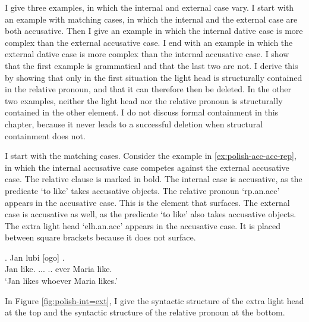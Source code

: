 I give three examples, in which the internal and external case vary.
I start with an example with matching cases, in which the internal and the external case are both accusative.
Then I give an example in which the internal dative case is more complex than the external accusative case.
I end with an example in which the external dative case is more complex than the internal accusative case.
I show that the first example is grammatical and that the last two are not. I derive this by showing that only in the first situation the light head is structurally contained in the relative pronoun, and that it can therefore then be deleted.
In the other two examples, neither the light head nor the relative pronoun is structurally contained in the other element.
I do not discuss formal containment in this chapter, because it never leads to a successful deletion when structural containment does not.

I start with the matching cases.
Consider the example in \ref{ex:polish-acc-acc-rep}, in which the internal accusative case competes against the external accusative case. The relative clause is marked in bold.
The internal case is accusative, as the predicate  `to like' takes accusative objects. The relative pronoun  `\ac{rp}.\ac{an}.\ac{acc}' appears in the accusative case. This is the element that surfaces.
The external case is accusative as well, as the predicate  `to like' also takes accusative objects. The extra light head  `\ac{elh}.\ac{an}.\ac{acc}' appears in the accusative case. It is placed between square brackets because it does not surface.

\exg. Jan lubi [ogo]    .\\
 Jan like.\scsub{[acc]} ...  .. ever Maria like.\scsub{[acc]}\\
 `Jan likes whoever Maria likes.' \label{ex:polish-acc-acc-rep}

In Figure \ref{fig:polish-int=ext}, I give the syntactic structure of the extra light head at the top and the syntactic structure of the relative pronoun at the bottom.

